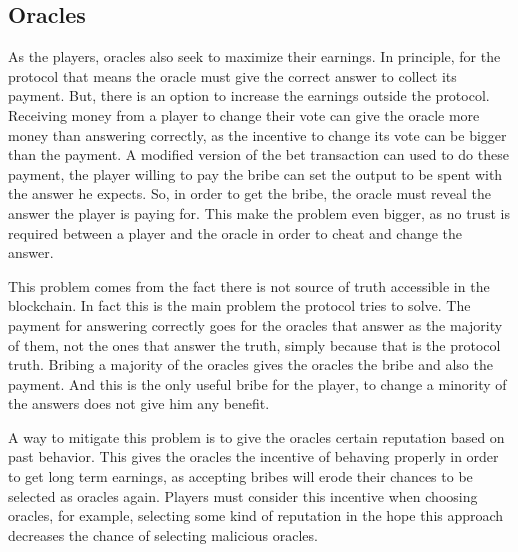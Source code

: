 \subsection{Oracles} \label{subsec:inc_oracles}

As the players, oracles also seek to maximize their earnings.
In principle, for the protocol that means the oracle must give the correct
  answer to collect its payment.
But, there is an option to increase the earnings outside the protocol. Receiving
  money from a player to change their vote can give the oracle more money than
  answering correctly, as the incentive to change its vote can be bigger than
  the payment.
A modified version of the bet transaction can used to do these payment, the
  player willing to pay the bribe can set the output to be spent with the answer
  he expects.
So, in order to get the bribe, the oracle must reveal the answer the player is
  paying for.
This make the problem even bigger, as no trust is required between a player and
  the oracle in order to cheat and change the answer.

This problem comes from the fact there is not source of truth accessible in the
  blockchain.
In fact this is the main problem the protocol tries to solve.
The payment for answering correctly goes for the oracles that answer as the
  majority of them, not the ones that answer the truth, simply because that is
  the protocol truth.
Bribing a majority of the oracles gives the oracles the bribe and also the
  payment.
And this is the only useful bribe for the player, to change a minority of the
  answers does not give him any benefit.

A way to mitigate this problem is to give the oracles certain reputation based
  on past behavior.
This gives the oracles the incentive of behaving properly in order to get long
  term earnings, as accepting bribes will erode their chances to be selected as
  oracles again.
Players must consider this incentive when choosing oracles, for example,
  selecting some kind of reputation in the hope this approach decreases the
  chance of selecting malicious oracles.
